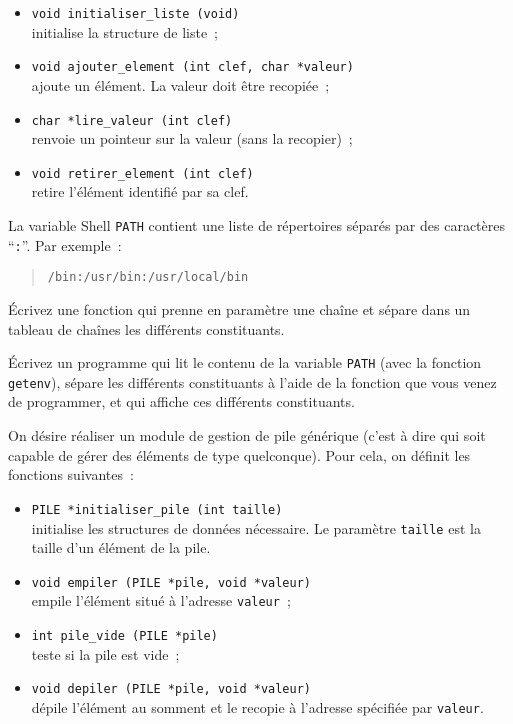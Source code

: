 \begin {itemize}
    \item \verb:void initialiser_liste (void): \\
	initialise la structure de liste~;
    \item \verb:void ajouter_element (int clef, char *valeur): \\
	ajoute un élément. La valeur doit être recopiée~;
    \item \verb:char *lire_valeur (int clef): \\
	renvoie un pointeur sur la valeur (sans la recopier)~;
    \item \verb:void retirer_element (int clef): \\
	retire l'élément identifié par sa clef.
\end {itemize}



\question
    \label {getpath}

La variable Shell {\tt PATH} contient une liste de répertoires séparés
par des caractères ``{\tt :}''.  Par exemple~:
\begin {quote}
\verb|/bin:/usr/bin:/usr/local/bin|
\end {quote}

Écrivez une fonction qui prenne en paramètre une chaîne et sépare dans
un tableau de chaînes les différents constituants.

Écrivez un programme qui lit le contenu de la variable {\tt PATH}
(avec la fonction {\tt getenv}), sépare les différents constituants à
l'aide de la fonction que vous venez de programmer, et qui affiche
ces différents constituants.


\question

On désire réaliser un module de gestion de pile générique (c'est à dire
qui soit capable de gérer des éléments de type quelconque). Pour cela,
on définit les fonctions suivantes~:

\begin {itemize}
    \item \verb:PILE *initialiser_pile (int taille):\\
	initialise les structures de données nécessaire. Le paramètre
	{\tt taille} est la taille d'un élément de la pile.
    \item \verb:void empiler (PILE *pile, void *valeur):\\
	empile l'élément situé à l'adresse {\tt valeur}~;
    \item \verb:int pile_vide (PILE *pile):\\
	teste si la pile est vide~;
    \item \verb:void depiler (PILE *pile, void *valeur):\\
	dépile l'élément au somment et le recopie à l'adresse spécifiée
	par {\tt valeur}.
\end {itemize}


